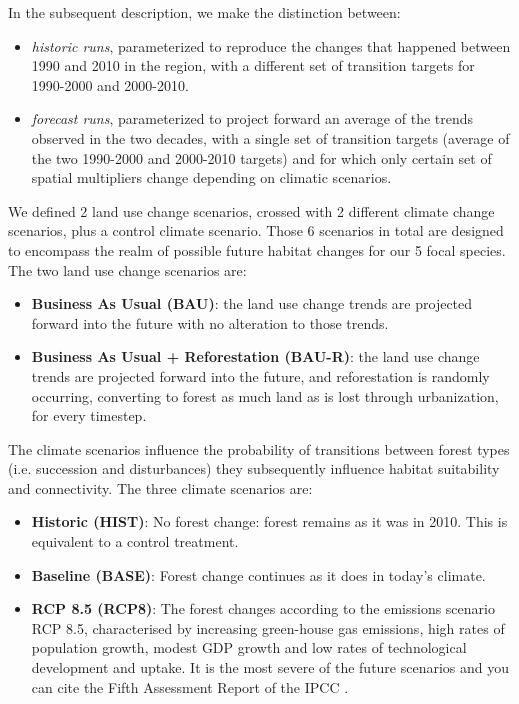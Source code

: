 In the subsequent description, we make the distinction between:
\begin{itemize}
\item{\textit{historic runs}}, parameterized to reproduce the changes that happened between 1990 and 2010 in the region, with a different set of transition targets for 1990-2000 and 2000-2010. 
\item{\textit{forecast runs}}, parameterized to project forward an average of the trends observed in the two decades, with a single set of transition targets (average of the two 1990-2000 and 2000-2010 targets) and for which only certain set of spatial multipliers change depending on climatic scenarios. 
\end{itemize}
We defined 2 land use change scenarios, crossed with 2 different climate change scenarios, plus a control climate scenario. Those 6 scenarios in total are designed to  encompass the realm of possible future habitat changes for our 5 focal species.
The two land use change scenarios are:
\begin{itemize}
\item{\textbf{Business As Usual (BAU)}}: the land use change trends are projected forward into the future with no alteration to those trends.
\item {\textbf{Business As Usual + Reforestation (BAU-R)}}: the land use change trends are projected forward into the future, and reforestation is randomly occurring, converting to forest as much land as is lost through urbanization, for every timestep.
\end{itemize} 
The climate scenarios influence the probability of transitions between forest types (i.e. succession and disturbances) they subsequently influence habitat suitability and connectivity. The three climate scenarios are:
\begin{itemize}
\item{\textbf{Historic (HIST)}}: No forest change: forest remains as it was in 2010. This is equivalent to a control treatment.
\item{\textbf{Baseline (BASE)}}: Forest change continues as it does in today's climate. 
\item{\textbf{RCP 8.5 (RCP8)}}: The forest changes according to the emissions scenario RCP 8.5, characterised by increasing green-house gas emissions, high rates of population growth, modest GDP growth and low rates of technological development and uptake. It is the most severe of the future scenarios and you can cite the Fifth Assessment Report of the IPCC \citep{ipcc_summary_2013}.\\
\end{itemize} 

